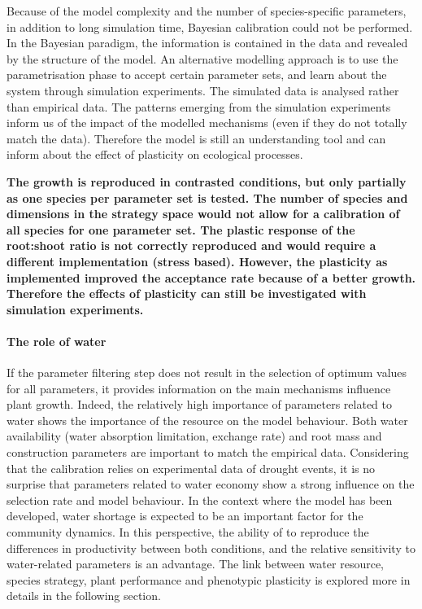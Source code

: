 Because of the model complexity and the number of species-specific parameters, in addition to long simulation time, Bayesian calibration could not be performed. In the Bayesian paradigm, the information is contained in the data and revealed by the structure of the model. An alternative modelling approach is to use the parametrisation phase to accept certain parameter sets, and learn about the system through simulation experiments. The simulated data is analysed rather than empirical data. The patterns emerging from the simulation experiments inform us of the impact of the modelled mechanisms (even if they do not totally match the data). Therefore the model is still an understanding tool and can inform about the effect of plasticity on ecological processes.


\textbf{The growth is reproduced in contrasted conditions, but only partially as one species per parameter set is tested. The number of species and dimensions in the strategy space would not allow for a calibration of all species for one parameter set. The plastic response of the root:shoot ratio is not correctly reproduced and would require a different implementation (stress based). However, the plasticity as implemented improved the acceptance rate because of a better growth. Therefore the effects of plasticity can still be investigated with simulation experiments.}

\paragraph{The role of water}

If the parameter filtering step does not result in the selection of optimum values for all parameters, it provides information on the main mechanisms influence plant growth. Indeed, the relatively high importance of parameters related to water shows the importance of the resource on the model behaviour. Both water availability (water absorption limitation, exchange rate) and root mass and construction parameters are important to match the empirical data. Considering that the calibration relies on experimental data of drought events, it is no surprise that parameters related to water economy show a strong influence on the selection rate and model behaviour. In the context where the model has been developed, water shortage is expected to be an important factor for the community dynamics. In this perspective, the ability of \model to reproduce the differences in productivity between both conditions, and the relative sensitivity to water-related parameters is an advantage. The link between water resource, species strategy, plant performance and phenotypic plasticity is explored more in details in the following section.


